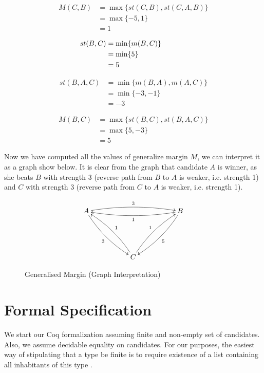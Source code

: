 \begin{align}
M (C, B)&=  \max \lbrace st (C, B), st(C, A, B) \rbrace \nonumber \\
                     &= \max \lbrace -5, 1 \rbrace \nonumber \\
                     &= 1\nonumber
\end{align}


\begin{align}
\hspace{-3cm} st (B, C)&=  \min \lbrace m (B, C) \rbrace  \nonumber \\
					  &= \min \lbrace 5 \rbrace  \nonumber \\
                     &= 5 \nonumber
\end{align}


\begin{align}
st (B, A, C)&= \min \lbrace m (B, A), m (A, C) \rbrace  \nonumber \\
                     &= \min \lbrace -3, -1\rbrace \nonumber \\
                     &= -3\nonumber
\end{align}

\begin{align}
M (B, C)&=  \max \lbrace st (B, C), st(B, A, C) \rbrace \nonumber \\
                     &= \max \lbrace 5, -3 \rbrace \nonumber \\
                     &= 5\nonumber
\end{align}

\noindent
Now we have computed all the values of generalize margin $M$, we can interpret it as a
graph show below.  It is clear from the graph that candidate $A$ is winner, as she beats 
$B$ with strength 3 (reverse path from $B$ to $A$ is weaker, i.e. strength 1) and 
$C$ with strength 3 (reverse path from $C$ to $A$ is weaker, i.e. strength 1). 

\begin{figure}[h] 
\[
 \xymatrix@R=12ex@C=12ex{
A \ar@/^/[rr]^{3} \ar@/_/[dr]_{3} & & B \ar@/^/[ll]^{1}
\ar@/^/[dl]^5 \\
& C \ar@/_/[ul]_{1} \ar@/^/[ur]^{1}
}\]
\caption{Generalised Margin (Graph Interpretation)}\label{generalizemargin}
\end{figure}
	 
	
	
\section{Formal Specification} \label{sec:spec}
	We start our Coq formalization assuming finite  and non-empty 
	set of candidates. Also, we assume decidable equality on 
	candidates. For our purposes, the
	easiest way of stipulating that a type be finite is to require
	existence of a list containing all inhabitants of this type \citep{DBLP:conf/icfp/FirsovU15}.

